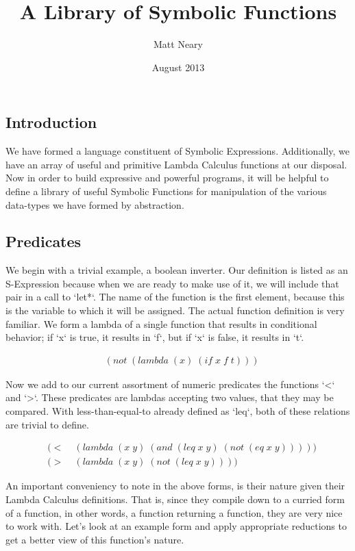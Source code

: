 \documentclass[11pt]{article}
\begin{document}
\begin{titlepage}
\title{A Library of Symbolic Functions}
\author{Matt Neary}
\date{August 2013}
\maketitle
\thispagestyle{empty}
\end{titlepage}
\subsection{Introduction}
We have formed a language constituent of Symbolic Expressions. Additionally, we have an array of useful and primitive Lambda Calculus functions at our disposal. Now in order to build expressive and powerful programs, it will be helpful to define a library of useful Symbolic Functions for manipulation of the various data-types we have formed by abstraction.

\subsection{Predicates}
We begin with a trivial example, a boolean inverter. Our definition is listed as an S-Expression because when we are ready to make use of it, we will include that pair in a call to `let*`. The name of the function is the first element, because this is the variable to which it will be assigned. The actual function definition is very familiar. We form a lambda of a single function that results in conditional behavior; if `x` is true, it results in `f`, but if `x` is false, it results in `t`.

\begin{align*}
& (not \; (lambda \; (x) \; (if \; x \; f \; t)))
\end{align*}

Now we add to our current assortment of numeric predicates the functions `<` and `>`. These predicates are lambdas accepting two values, that they may be compared. With less-than-equal-to already defined as `leq`, both of these relations are trivial to define.

\begin{align*}
& (< \; &(lambda \; (x \; y) \; (and \; (leq \; x \; y) \; (not \; (eq \; x \; y)))))
\\& (> \; &(lambda \; (x \; y) \; (not \; (leq \; x \; y))))
\end{align*}

An important conveniency to note in the above forms, is their nature given their Lambda Calculus definitions. That is, since they compile down to a curried form of a function, in other words, a function returning a function, they are very nice to work with. Let's look at an example form and apply appropriate reductions to get a better view of this function's nature.
\end{document}
